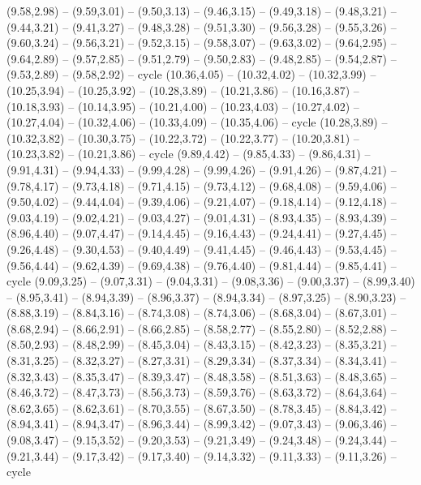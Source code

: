 \expandafter\def\csname geo:gebiet:VNM\endcsname{
  (9.58,2.98) -- (9.59,3.01) -- (9.50,3.13) -- (9.46,3.15) -- (9.49,3.18) -- (9.48,3.21) -- (9.44,3.21) -- (9.41,3.27) -- (9.48,3.28) -- (9.51,3.30) -- (9.56,3.28) -- (9.55,3.26) -- (9.60,3.24) -- (9.56,3.21) -- (9.52,3.15) -- (9.58,3.07) -- (9.63,3.02) -- (9.64,2.95) -- (9.64,2.89) -- (9.57,2.85) -- (9.51,2.79) -- (9.50,2.83) -- (9.48,2.85) -- (9.54,2.87) -- (9.53,2.89) -- (9.58,2.92) -- cycle}
\expandafter\def\csname geo:gebiet:PRK\endcsname{
  (10.36,4.05) -- (10.32,4.02) -- (10.32,3.99) -- (10.25,3.94) -- (10.25,3.92) -- (10.28,3.89) -- (10.21,3.86) -- (10.16,3.87) -- (10.18,3.93) -- (10.14,3.95) -- (10.21,4.00) -- (10.23,4.03) -- (10.27,4.02) -- (10.27,4.04) -- (10.32,4.06) -- (10.33,4.09) -- (10.35,4.06) -- cycle}
\expandafter\def\csname geo:gebiet:KOR\endcsname{
  (10.28,3.89) -- (10.32,3.82) -- (10.30,3.75) -- (10.22,3.72) -- (10.22,3.77) -- (10.20,3.81) -- (10.23,3.82) -- (10.21,3.86) -- cycle}
\expandafter\def\csname geo:gebiet:MNG\endcsname{
  (9.89,4.42) -- (9.85,4.33) -- (9.86,4.31) -- (9.91,4.31) -- (9.94,4.33) -- (9.99,4.28) -- (9.99,4.26) -- (9.91,4.26) -- (9.87,4.21) -- (9.78,4.17) -- (9.73,4.18) -- (9.71,4.15) -- (9.73,4.12) -- (9.68,4.08) -- (9.59,4.06) -- (9.50,4.02) -- (9.44,4.04) -- (9.39,4.06) -- (9.21,4.07) -- (9.18,4.14) -- (9.12,4.18) -- (9.03,4.19) -- (9.02,4.21) -- (9.03,4.27) -- (9.01,4.31) -- (8.93,4.35) -- (8.93,4.39) -- (8.96,4.40) -- (9.07,4.47) -- (9.14,4.45) -- (9.16,4.43) -- (9.24,4.41) -- (9.27,4.45) -- (9.26,4.48) -- (9.30,4.53) -- (9.40,4.49) -- (9.41,4.45) -- (9.46,4.43) -- (9.53,4.45) -- (9.56,4.44) -- (9.62,4.39) -- (9.69,4.38) -- (9.76,4.40) -- (9.81,4.44) -- (9.85,4.41) -- cycle}
\expandafter\def\csname geo:gebiet:IND\endcsname{
  (9.09,3.25) -- (9.07,3.31) -- (9.04,3.31) -- (9.08,3.36) -- (9.00,3.37) -- (8.99,3.40) -- (8.95,3.41) -- (8.94,3.39) -- (8.96,3.37) -- (8.94,3.34) -- (8.97,3.25) -- (8.90,3.23) -- (8.88,3.19) -- (8.84,3.16) -- (8.74,3.08) -- (8.74,3.06) -- (8.68,3.04) -- (8.67,3.01) -- (8.68,2.94) -- (8.66,2.91) -- (8.66,2.85) -- (8.58,2.77) -- (8.55,2.80) -- (8.52,2.88) -- (8.50,2.93) -- (8.48,2.99) -- (8.45,3.04) -- (8.43,3.15) -- (8.42,3.23) -- (8.35,3.21) -- (8.31,3.25) -- (8.32,3.27) -- (8.27,3.31) -- (8.29,3.34) -- (8.37,3.34) -- (8.34,3.41) -- (8.32,3.43) -- (8.35,3.47) -- (8.39,3.47) -- (8.48,3.58) -- (8.51,3.63) -- (8.48,3.65) -- (8.46,3.72) -- (8.47,3.73) -- (8.56,3.73) -- (8.59,3.76) -- (8.63,3.72) -- (8.64,3.64) -- (8.62,3.65) -- (8.62,3.61) -- (8.70,3.55) -- (8.67,3.50) -- (8.78,3.45) -- (8.84,3.42) -- (8.94,3.41) -- (8.94,3.47) -- (8.96,3.44) -- (8.99,3.42) -- (9.07,3.43) -- (9.06,3.46) -- (9.08,3.47) -- (9.15,3.52) -- (9.20,3.53) -- (9.21,3.49) -- (9.24,3.48) -- (9.24,3.44) -- (9.21,3.44) -- (9.17,3.42) -- (9.17,3.40) -- (9.14,3.32) -- (9.11,3.33) -- (9.11,3.26) -- cycle}
